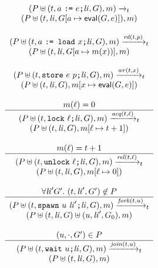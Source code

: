 \documentclass[preprint, 10pt]{sigplanconf}
\newcommand{\assign}[2]{#1\ \texttt{:=}\ #2}
\newcommand{\load}[2]{#1\ \texttt{:= load}\ #2}
\newcommand{\store}[2]{\texttt{store}\ #2\ #1}
\newcommand{\lock}[1]{\texttt{lock}\ #1}
\newcommand{\unlock}[1]{\texttt{unlock}\ #1}
\newcommand{\spawn}[2]{\texttt{spawn}\ #1\ #2}
\newcommand{\wait}[1]{\texttt{wait}\ #1}
\newcommand{\cfg}[2]{\ensuremath{(#1, #2)}}
\newcommand{\anarrow}[2]{\ensuremath{\xrightarrow{#2}_{#1}}}
\begin{document}
\begin{figure}[tb]
\[
\begin{array}{c}
 \cfg{P \uplus (t, \assign{a}{e}\texttt{;} \mathit{li}, G)}{m}  
\anarrow{t}{} \\
\cfg{P \uplus (t, \mathit{li}, G[a \mapsto \mathsf{eval}(G, e)])}{m}
\\\\

\cfg{P \uplus (t, \load{a}{x}\texttt{;} \mathit{li}, G)}{m}  
\anarrow{t}{\mathit{rd}(t, p)} \\
\cfg{P \uplus (t, \mathit{li}, G[a \mapsto m(x))]}{m}
\\\\

\cfg{P \uplus (t, \store{p}{e}\texttt{;} \mathit{li}, G)}{m} 
\anarrow{t}{\mathit{wr}(t, x)} \\
\cfg{P \uplus (t, \mathit{li}, G)}{m[x \mapsto \mathsf{eval}(G, e)]}
\\\\

\multicolumn{1}{c}{m(\ell) = 0}
\\ \hline
\cfg{P \uplus (t, \lock{\ell}\texttt{;} \mathit{li}, G)}{m}
 \anarrow{t}{\mathit{acq}(t, \ell)} \\
\cfg{P \uplus (t, \mathit{li}, G)}{m[\ell \mapsto t + 1]}
\\\\

\multicolumn{1}{c}{m(\ell) = t + 1} 
\\ \hline
\cfg{P \uplus (t, \unlock{\ell}\texttt{;} \mathit{li}, G)}{m}
\anarrow{t}{\mathit{rel}(t, \ell)} \\
\cfg{P \uplus (t, \mathit{li}, G)}{m[\ell \mapsto 0]}
\\\\

\multicolumn{1}{c}{\forall \mathit{li}' G'.\ (t, \mathit{li}', G') \not\in P}
\\ \hline \rule{0pt}{2.5ex}
\cfg{P \uplus (t, \spawn{u}{\mathit{li}'}\texttt{;} \mathit{li}, G)}{m}
\anarrow{t}{\mathit{fork}(t, u)} \\
\cfg{P \uplus (t, \mathit{li}, G) \uplus (u, \mathit{li}', G_0)}{m}
\\\\

\multicolumn{1}{c}{(u, \cdot, G') \in P}
\\ \hline \rule{0pt}{2.5ex}
\cfg{P \uplus (t, \wait{u}\texttt{;} \mathit{li}, G)}{m}
 \anarrow{t}{\mathit{join}(t, u)} \\
\cfg{P \uplus (t, \mathit{li}, G)}{m}
\\\\


\end{array}\]
\end{figure}
\end{document}
